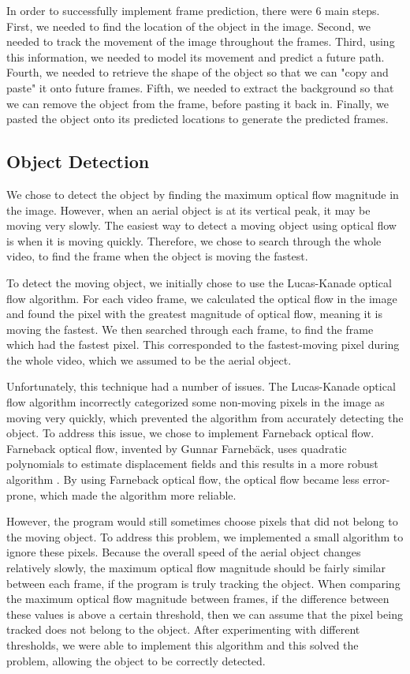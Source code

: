\documentclass[12pt]{article}
\begin{document}
In order to successfully implement frame prediction, there were 6 main steps. First, we needed to find the location of the object in the image. Second, we needed to track the movement of the image throughout the frames. Third, using this information, we needed to model its movement and predict a future path. Fourth, we needed to retrieve the shape of the object so that we can "copy and paste" it onto future frames. Fifth, we needed to extract the background so that we can remove the object from the frame, before pasting it back in. Finally, we pasted the object onto its predicted locations to generate the predicted frames.

\subsection*{Object Detection}

We chose to detect the object by finding the maximum optical flow magnitude in the image. However, when an aerial object is at its vertical peak, it may be moving very slowly. The easiest way to detect a moving object using optical flow is when it is moving quickly. Therefore, we chose to search through the whole video, to find the frame when the object is moving the fastest.

To detect the moving object, we initially chose to use the Lucas-Kanade optical flow algorithm. For each video frame, we calculated the optical flow in the image and found the pixel with the greatest magnitude of optical flow, meaning it is moving the fastest. We then searched through each frame, to find the frame which had the fastest pixel. This corresponded to the fastest-moving pixel during the whole video, which we assumed to be the aerial object.

Unfortunately, this technique had a number of issues. The Lucas-Kanade optical flow algorithm incorrectly categorized some non-moving pixels in the image as moving very quickly, which prevented the algorithm from accurately detecting the object. To address this issue, we chose to implement Farneback optical flow. Farneback optical flow, invented by Gunnar Farnebäck, uses quadratic polynomials to estimate displacement fields and this results in a more robust algorithm \cite{farneback2003}. By using Farneback optical flow, the optical flow became less error-prone, which made the algorithm more reliable.

However, the program would still sometimes choose pixels that did not belong to the moving object. To address this problem, we implemented a small algorithm to ignore these pixels. Because the overall speed of the aerial object changes relatively slowly, the maximum optical flow magnitude should be fairly similar between each frame, if the program is truly tracking the object. When comparing the maximum optical flow magnitude between frames, if the difference between these values is above a certain threshold, then we can assume that the pixel being tracked does not belong to the object. After experimenting with different thresholds, we were able to implement this algorithm and this solved the problem, allowing the object to be correctly detected.
\end{document}
